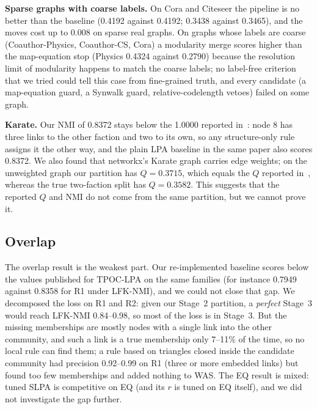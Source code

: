 \documentclass[conference]{IEEEtran}
\begin{document}
\textbf{Sparse graphs with coarse labels.} On Cora and Citeseer the pipeline is no better than the baseline (0.4192 against 0.4192; 0.3438 against 0.3465), and the moves cost up to 0.008 on sparse real graphs. On graphs whose labels are coarse (Coauthor-Physics, Coauthor-CS, Cora) a modularity merge scores higher than the map-equation stop (Physics 0.4324 against 0.2790) because the resolution limit of modularity happens to match the coarse labels; no label-free criterion that we tried could tell this case from fine-grained truth, and every candidate (a map-equation guard, a Synwalk guard, relative-codelength vetoes) failed on some graph.

\textbf{Karate.} Our NMI of 0.8372 stays below the 1.0000 reported in~\cite{kong2026}: node 8 has three links to the other faction and two to its own, so any structure-only rule assigns it the other way, and the plain LPA baseline in the same paper also scores 0.8372. We also found that networkx's Karate graph carries edge weights; on the unweighted graph our partition has $Q=0.3715$, which equals the $Q$ reported in~\cite{kong2026}, whereas the true two-faction split has $Q=0.3582$. This suggests that the reported $Q$ and NMI do not come from the same partition, but we cannot prove it.

\subsection{Overlap}
The overlap result is the weakest part. Our re-implemented baseline scores below the values published for TPOC-LPA on the same families (for instance 0.7949 against 0.8358 for R1 under LFK-NMI), and we could not close that gap. We decomposed the loss on R1 and R2: given our Stage~2 partition, a \emph{perfect} Stage~3 would reach LFK-NMI 0.84--0.98, so most of the loss is in Stage~3. But the missing memberships are mostly nodes with a single link into the other community, and such a link is a true membership only 7--11\% of the time, so no local rule can find them; a rule based on triangles closed inside the candidate community had precision 0.92--0.99 on R1 (three or more embedded links) but found too few memberships and added nothing to WAS. The EQ result is mixed: tuned SLPA is competitive on EQ (and its $r$ is tuned on EQ itself), and we did not investigate the gap further.
\end{document}
